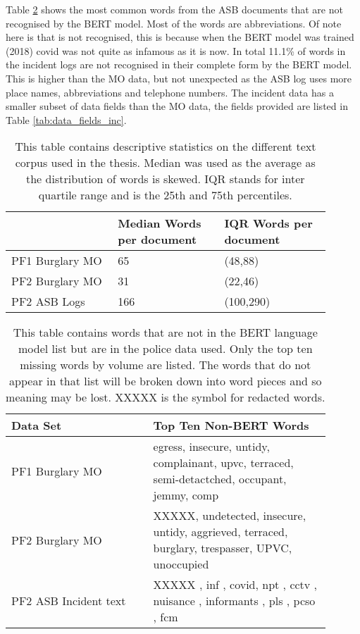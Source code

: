 

Table \ref{tab:non_bert_words} shows the most common words from the ASB documents that are not recognised by the BERT model. Most of the words are abbreviations. Of note here is that  is not recognised, this is because when the BERT model was trained (2018) covid was not quite as infamous as it is now. In total 11.1\% of words in the incident logs are not recognised in their complete form by the BERT model. This is higher than the MO data, but not unexpected as the ASB log uses more place names, abbreviations and telephone numbers. The incident data has a smaller subset of data fields than the MO data, the fields provided are listed in Table \ref{tab:data_fields_inc}.

\begin{table}[h]
\centering
\begin{tabular}{p{0.3\linewidth}p{0.3\linewidth}p{0.3\linewidth}} 
\toprule
                         & Median Words per document & IQR  Words per document \\\midrule
PF1 Burglary MO    &          65                 &           (48,88)                                               \\
PF2 Burglary MO &          31                 &    (22,46)                                         \\
PF2 ASB Logs      &           166                &         (100,290)                              \\  \bottomrule
\end{tabular}
\caption[Text data descriptive statistics]{\label{tab:corpus_stats} This table contains descriptive statistics on the different text corpus used in the thesis. Median was used as the average as the distribution of words is skewed. IQR stands for inter quartile range and is the 25th and 75th percentiles. }
\end{table}

\begin{table}[h]
\centering
\begin{tabular}{p{0.4\linewidth}p{0.5\linewidth}}
\toprule
Data Set& Top Ten Non-BERT Words                                       \\ \midrule
PF1 Burglary MO       &  egress, insecure, untidy, complainant, upvc, terraced, semi-detactched, occupant, jemmy, comp  \\
PF2 Burglary MO       & XXXXX, undetected, insecure, untidy, aggrieved, terraced, burglary, trespasser, UPVC, unoccupied \\
PF2 ASB Incident text &  XXXXX , inf , covid, npt , cctv , nuisance , informants , pls , pcso , fcm       \\ \bottomrule
\end{tabular}
\caption[Non-Bert words PF1 and PF2 data]{\label{tab:non_bert_words} This table contains words that are not in the BERT language model list but are in the police data used. Only the top ten missing words by volume are listed. The words that do not appear in that list will be broken down into word pieces and so meaning may be lost. XXXXX is the symbol for redacted words.}
\end{table}
